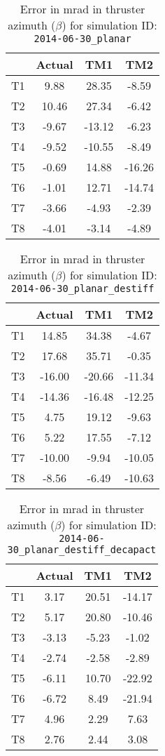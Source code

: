 \begin{table}[H]
\centering
\cprotect\caption{Error in mrad in thruster azimuth ($\beta$) for simulation ID:\\
\verb|2014-06-30_planar|}
\begin{tabular}{|c|c|c|c|} \hline
~ & Actual & TM1 & TM2 \\ \hline
T1 & 9.88 & 28.35 & -8.59 \\
T2 & 10.46 & 27.34 & -6.42 \\
T3 & -9.67 & -13.12 & -6.23 \\
T4 & -9.52 & -10.55 & -8.49 \\
T5 & -0.69 & 14.88 & -16.26 \\
T6 & -1.01 & 12.71 & -14.74 \\
T7 & -3.66 & -4.93 & -2.39 \\
T8 & -4.01 & -3.14 & -4.89 \\ \hline
\end{tabular}
\label{beta-1}
\end{table}

\begin{table}[H]
\centering
\cprotect\caption{Error in mrad in thruster azimuth ($\beta$) for simulation ID:\\
\verb|2014-06-30_planar_destiff|}
\begin{tabular}{|c|c|c|c|} \hline
~ & Actual & TM1 & TM2 \\ \hline
T1 & 14.85 & 34.38 & -4.67 \\
T2 & 17.68 & 35.71 & -0.35 \\
T3 & -16.00 & -20.66 & -11.34 \\
T4 & -14.36 & -16.48 & -12.25 \\
T5 & 4.75 & 19.12 & -9.63 \\
T6 & 5.22 & 17.55 & -7.12 \\
T7 & -10.00 & -9.94 & -10.05 \\
T8 & -8.56 & -6.49 & -10.63 \\ \hline
\end{tabular}
\label{beta-2}
\end{table}

\begin{table}[H]
\centering
\cprotect\caption{Error in mrad in thruster azimuth ($\beta$) for simulation ID:\\
\verb|2014-06-30_planar_destiff_decapact|}
\begin{tabular}{|c|c|c|c|} \hline
~ & Actual & TM1 & TM2 \\ \hline
T1 & 3.17 & 20.51 & -14.17 \\
T2 & 5.17 & 20.80 & -10.46 \\
T3 & -3.13 & -5.23 & -1.02 \\
T4 & -2.74 & -2.58 & -2.89 \\
T5 & -6.11 & 10.70 & -22.92 \\
T6 & -6.72 & 8.49 & -21.94 \\
T7 & 4.96 & 2.29 & 7.63 \\
T8 & 2.76 & 2.44 & 3.08 \\ \hline
\end{tabular}
\label{beta-3}
\end{table}

